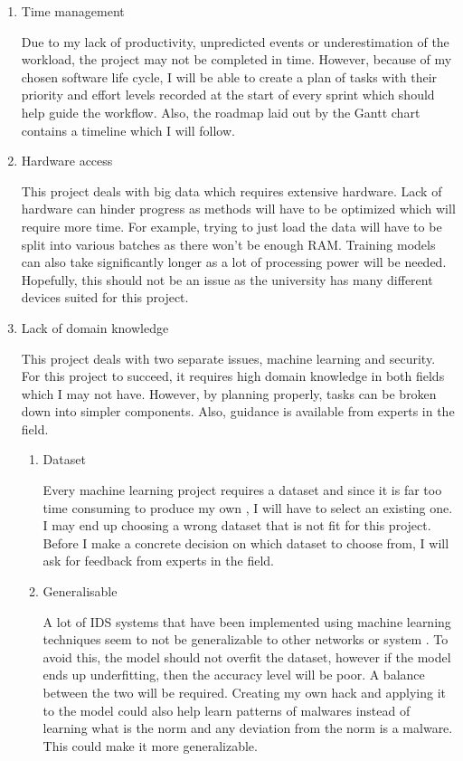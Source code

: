 \documentclass[11pt]{article}
\begin{document}
\begin{enumerate}
  \item{Time management}

  Due to my lack of productivity, unpredicted events or underestimation of the workload, the project may not be completed in time. However, because of my chosen software life cycle, I will be able to create a plan of tasks with their priority and effort levels recorded at the start of every sprint which should help guide the workflow. Also, the roadmap laid out by the Gantt chart contains a timeline which I will follow.

  \item{Hardware access}

  This project deals with big data which requires extensive hardware. Lack of hardware can hinder progress as methods will have to be optimized which will require more time. For example, trying to just load the data will have to be split into various batches as there won’t be enough RAM. Training models can also take significantly longer as a lot of processing power will be needed. Hopefully, this should not be an issue as the university has many different devices suited for this project. 

  \item{Lack of domain knowledge}

  This project deals with two separate issues, machine learning and security. For this project to succeed, it requires high domain knowledge in both fields which I may not have. However, by planning properly, tasks can be broken down into simpler components. Also, guidance is available from experts in the field.

  \begin{enumerate}
    \item{Dataset}

    Every machine learning project requires a dataset and since it is far too time consuming to produce my own \cite{methodology-general}, I will have to select an existing one. I may end up choosing a wrong dataset that is not fit for this project. Before I make a concrete decision on which dataset to choose from, I will ask for feedback from experts in the field.

    \item{Generalisable}

    A lot of IDS systems that have been implemented using machine learning techniques seem to not be generalizable to other networks or system \cite{methodology-general}. To avoid this, the model should not overfit the dataset, however if the model ends up underfitting, then the accuracy level will be poor. A balance between the two will be required. 
Creating my own hack and applying it to the model could also help learn patterns of malwares instead of learning what is the norm and any deviation from the norm is a malware. This could make it more generalizable.


\end{enumerate}
\end{enumerate}
\end{document}
